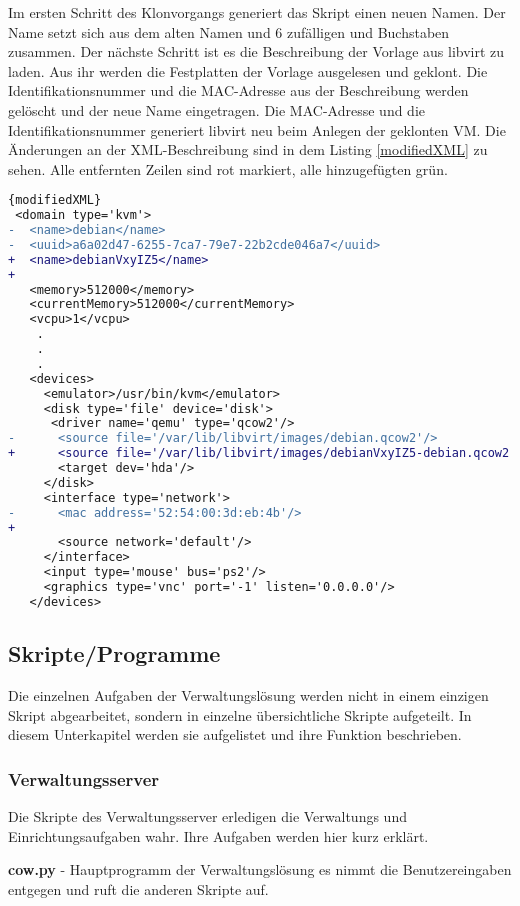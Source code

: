 Im ersten Schritt des Klonvorgangs generiert das Skript einen neuen Namen. Der Name setzt sich aus dem alten Namen und 6 zufälligen und Buchstaben zusammen. Der nächste Schritt ist es die Beschreibung der Vorlage aus libvirt zu laden. Aus ihr werden die Festplatten der Vorlage ausgelesen und geklont. Die Identifikationsnummer und die MAC-Adresse aus der Beschreibung werden gelöscht und der neue Name eingetragen. Die MAC-Adresse und die Identifikationsnummer generiert libvirt neu beim Anlegen der geklonten VM. Die Änderungen an der XML-Beschreibung sind in dem Listing \ref{modifiedXML} zu sehen. Alle entfernten Zeilen sind rot markiert, alle hinzugefügten grün.
\\
\begin{lstlisting}[caption=modifizierte XML-Beschreibung,language=diff,label=modifiedXML]{modifiedXML}
 <domain type='kvm'>
-  <name>debian</name>
-  <uuid>a6a02d47-6255-7ca7-79e7-22b2cde046a7</uuid>
+  <name>debianVxyIZ5</name>
+  
   <memory>512000</memory>
   <currentMemory>512000</currentMemory>
   <vcpu>1</vcpu>
    .
    .
    .
   <devices>
     <emulator>/usr/bin/kvm</emulator>
     <disk type='file' device='disk'>
      <driver name='qemu' type='qcow2'/>
-      <source file='/var/lib/libvirt/images/debian.qcow2'/>
+      <source file='/var/lib/libvirt/images/debianVxyIZ5-debian.qcow2'/>
       <target dev='hda'/>
     </disk>
     <interface type='network'>
-      <mac address='52:54:00:3d:eb:4b'/>
+      
       <source network='default'/>
     </interface>
     <input type='mouse' bus='ps2'/>
     <graphics type='vnc' port='-1' listen='0.0.0.0'/>
   </devices>
\end{lstlisting}

\subsection{Skripte/Programme}
Die einzelnen Aufgaben der Verwaltungslösung werden nicht in einem einzigen Skript abgearbeitet, sondern in einzelne übersichtliche Skripte aufgeteilt. In diesem Unterkapitel werden sie aufgelistet und ihre Funktion beschrieben.

\subsubsection{Verwaltungsserver}
Die Skripte des Verwaltungsserver erledigen die Verwaltungs und Einrichtungsaufgaben wahr. Ihre Aufgaben werden hier kurz erklärt.

\textbf{cow.py}
- Hauptprogramm der Verwaltungslösung es nimmt die Benutzereingaben entgegen und ruft die anderen Skripte auf.

